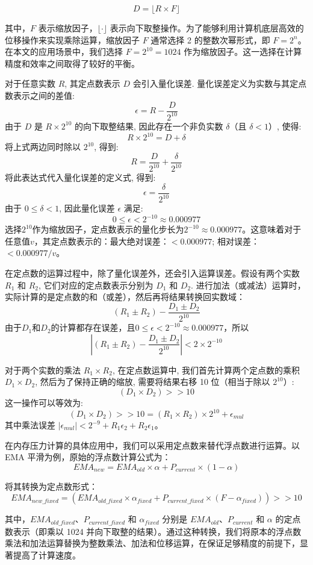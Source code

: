 \[
D = \lfloor R \times F \rfloor
\]

其中，\(F\) 表示缩放因子，\(\lfloor \cdot \rfloor\) 表示向下取整操作。为了能够利用计算机底层高效的位移操作来实现乘除运算，缩放因子 \(F\) 通常选择 2 的整数次幂形式，即 \(F = 2^n\)。在本文的应用场景中，我们选择 \(F = 2^{10} = 1024\) 作为缩放因子。这一选择在计算精度和效率之间取得了较好的平衡。

对于任意实数 \(R\), 其定点数表示 \(D\) 会引入量化误差. 量化误差定义为实数与其定点数表示之间的差值:
\[
\epsilon = R - \frac{D}{2^{10}}
\]
由于 \(D\) 是 \(R \times 2^{10}\) 的向下取整结果, 因此存在一个非负实数 \(\delta\)（且 \(\delta < 1\)）, 使得:
\[
R \times 2^{10} = D + \delta
\]
将上式两边同时除以 \(2^{10}\), 得到:
\[
R = \frac{D}{2^{10}} + \frac{\delta}{2^{10}}
\]
将此表达式代入量化误差的定义式, 得到:
\[
\epsilon = \frac{\delta}{2^{10}}
\]
由于 \(0 \leq \delta < 1\), 因此量化误差 \(\epsilon\) 满足:
\[
0 \leq \epsilon < 2^{-10} \approx 0.000977
\]
选择\(2^{10}\)作为缩放因子，定点数表示的量化步长为\(2^{-10} \approx 0.000977\)。这意味着对于任意值\(v\)，其定点数表示的：最大绝对误差：\(< 0.000977\); 相对误差：\(< 0.000977/v\)。

在定点数的运算过程中，除了量化误差外，还会引入运算误差。假设有两个实数 \(R_1\) 和 \(R_2\), 它们对应的定点数表示分别为 \(D_1\) 和 \(D_2\). 进行加法（或减法）运算时，实际计算的是定点数的和（或差），然后再将结果转换回实数域：
\[
(R_1 \pm R_2) - \frac{D_1 \pm D_2}{2^{10}}
\]
由于\(D_1\)和\(D_2\)的计算都存在误差，且\(0 \leq \epsilon < 2^{-10} \approx 0.000977\)，所以
\[
|(R_1 \pm R_2) - \frac{D_1 \pm D_2}{2^{10}}| < 2 \times 2^{-10}
\]

对于两个实数的乘法 \(R_1 \times R_2\), 在定点数运算中, 我们首先计算两个定点数的乘积 \(D_1 \times D_2\), 然后为了保持正确的缩放, 需要将结果右移 10 位（相当于除以 \(2^{10}\)）:
\[
(D_1 \times D_2) >> 10
\]
这一操作可以等效为:
\[
(D_1 \times D_2) >> 10 = (R_1 \times R_2) \times 2^{10} + \epsilon_{mul}
\]
其中乘法误差 \(|\epsilon_{mul}| < 2^{-9} + R_1\epsilon_2 + R_2\epsilon_1\)。

在内存压力计算的具体应用中，我们可以采用定点数来替代浮点数进行运算。以 EMA 平滑为例，原始的浮点数计算公式为：
\[
EMA_{new} = EMA_{old} \times \alpha + P_{current} \times (1 - \alpha)
\]

将其转换为定点数形式：
\[
EMA_{new\_fixed} = (EMA_{old\_fixed} \times \alpha_{fixed} + P_{current\_fixed} \times (F - \alpha_{fixed})) >> 10
\]

其中，\(EMA_{old\_fixed}\)、\(P_{current\_fixed}\) 和 \(\alpha_{fixed}\) 分别是 \(EMA_{old}\)、\(P_{current}\) 和 \(\alpha\) 的定点数表示（即乘以 1024 并向下取整的结果）。通过这种转换，我们将原本的浮点数乘法和加法运算替换为整数乘法、加法和位移运算，在保证足够精度的前提下，显著提高了计算速度。



